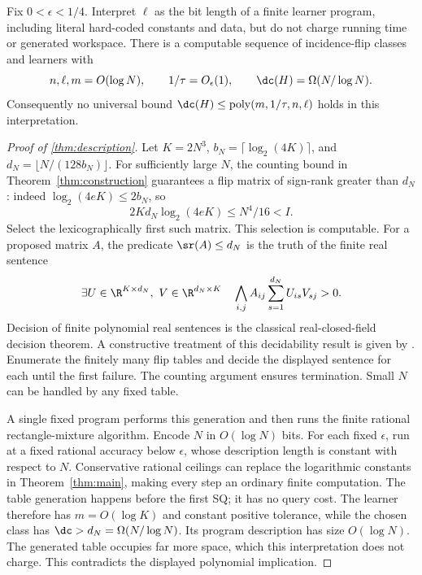 \begin{theorem}\label{thm:description}
Fix $0<\epsilon<1/4$. Interpret $\ell$ as the bit length of a finite learner program, including literal hard-coded constants and data, but do not charge running time or generated workspace. There is a computable sequence of incidence-flip classes and learners with
\[
 n,\ell,m=O(\log N),\qquad 1/\tau=O_\epsilon(1),\qquad
 \dc(H)=\Omega(N/\log N).
\]
Consequently no universal bound $\dc(H)\le\operatorname{poly}(m,1/\tau,n,\ell)$ holds in this interpretation.
\end{theorem}

\begin{proof}[Proof of \cref{thm:description}]
Let $K=2N^3$, $b_N=\lceil\log_2(4K)\rceil$, and $d_N=\lfloor N/(128b_N)\rfloor$. For sufficiently large $N$, the counting bound in Theorem~\ref{thm:construction} guarantees a flip matrix of sign-rank greater than $d_N$: indeed $\log_2(4eK)\le2b_N$, so
\[
 2Kd_N\log_2(4eK)\le N^4/16<I.
\]
Select the lexicographically first such matrix. This selection is computable. For a proposed matrix $A$, the predicate $\sr(A)\le d_N$ is the truth of the finite real sentence
\[
 \exists U\in\R^{K\times d_N},\ V\in\R^{d_N\times K}\quad
 \bigwedge_{i,j} A_{ij}\sum_{s=1}^{d_N}U_{is}V_{sj}>0.
\]
Decision of finite polynomial real sentences is the classical real-closed-field decision theorem. A constructive treatment of this decidability result is given by \citet{MC12}. Enumerate the finitely many flip tables and decide the displayed sentence for each until the first failure. The counting argument ensures termination. Small $N$ can be handled by any fixed table.

A single fixed program performs this generation and then runs the finite rational rectangle-mixture algorithm. Encode $N$ in $O(\log N)$ bits. For each fixed $\epsilon$, run at a fixed rational accuracy below $\epsilon$, whose description length is constant with respect to $N$. Conservative rational ceilings can replace the logarithmic constants in Theorem~\ref{thm:main}, making every step an ordinary finite computation. The table generation happens before the first SQ; it has no query cost. The learner therefore has $m=O(\log K)$ and constant positive tolerance, while the chosen class has $\dc>d_N=\Omega(N/\log N)$. Its program description has size $O(\log N)$. The generated table occupies far more space, which this interpretation does not charge. This contradicts the displayed polynomial implication.
\end{proof}
